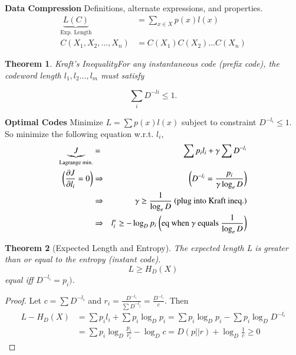 \documentclass[10pt]{article}
\newtheorem{thm}{Theorem}[section]
\begin{document}
\begin{tiny}
\begin{multicols}{3}
\textbf{\scriptsize Data Compression}
Definitions, alternate expressions, and properties.
\begin{align}
    \underbrace{L(C)}_\text{Exp. Length}&= \sum_{x\in X} p(x)l(x) \label{defn: Exp. Length}\\
C(X_1,X_2,\ldots,X_n) &= C(X_1)C(X_2)\ldots C(X_n)
\end{align}

\begin{thm}{Kraft's Inequality}\label{thm: kraft}
For any instantaneous code (prefix code), the codeword length $l_1,l_2 \ldots , l_m$ must satisfy
\end{thm}

\begin{equation}
\sum_i D^{-li}  \leq 1.
\end{equation}

\textbf{\scriptsize{Optimal Codes}}
Minimize $L = \sum p(x) l(x)$ subject to constraint $D^{-l_i} \leq 1$. So minimize the following equation w.r.t. $l_i$,
\begin{align*}
\underbrace{J}_\text{Lagrange min.} &=& \sum {p_i}{l_i} + \gamma \sum D^{-l_i} \label{defn: lagrange} \\
\bigg(\frac{\partial J}{\partial l_i} = 0\bigg) &\Rightarrow& \bigg(D^{-l_i} = \frac{p_i}{\gamma \log_e D}\bigg) \\
&\Rightarrow& \gamma \ge \frac{1}{\log_e D} \text{ (plug into Kraft ineq.)} \\
&\Rightarrow& l_i^* \geq - \log_D p_i \text{ \bigg(eq when $\gamma$ equals $\frac{1}{\log_e D}$\bigg)}
\end{align*}

\begin{thm}[Expected Length and Entropy]\label{thm: codewordentropy}
The expected length L is greater than or equal to the entropy (instant code).
\[L \geq H_D(X) \]
equal iff $D^{-l_i} = p_i )$.
\end{thm}
\begin{proof} Let 
    $c = \sum D^{-l_i}$ and $r_i = \frac {D^{-l_i}}{\sum D^{-l_j}} = \frac{D^{-l_i}}{c}$. Then
\begin{align*}
L - H_D(X) &= \sum {p_i}{l_i} + \sum {p_i} \log_D p_i = \sum {p_i} \log_D {p_i} - \sum {p_i} \log_D D^{-l_i} \\
&= \sum {p_i} \log_D \frac {p_i}{r_i} - \log_D c = D(p||r) + \log_D \frac {1}{c} \geq 0 
\end{align*}
\end{proof}


\end{multicols}
\end{tiny}
\end{document}
